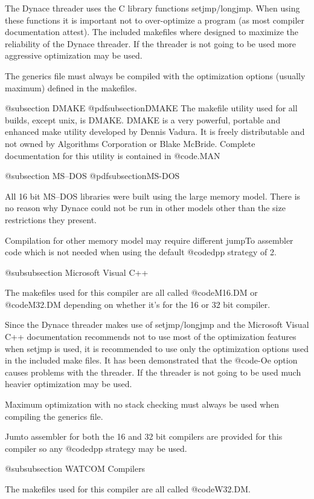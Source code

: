 The Dynace threader uses the C library functions setjmp/longjmp.  When using
these functions it is important not to over-optimize a program (as most
compiler documentation attest).  The included makefiles where designed
to maximize the reliability of the Dynace threader.  If the threader is not
going to be used more aggressive optimization may be used.

The generics file must always be compiled with the optimization options
(usually maximum) defined in the makefiles.


@subsection DMAKE
@pdfsubsection{DMAKE}
The makefile utility used for all builds, except unix, is DMAKE.
DMAKE is a very powerful, portable and enhanced make utility developed
by Dennis Vadura.  It is freely distributable and not owned by
Algorithms Corporation or Blake McBride.  Complete documentation for this utility
is contained in @code{\DYNACE\DOCS\DMAKE.MAN}

@subsection MS--DOS
@pdfsubsection{MS-DOS}

All 16 bit MS--DOS libraries were built using the large memory model.  There
is no reason why Dynace could not be run in other models other than the
size restrictions they present.  

Compilation for other memory model may require different jumpTo assembler
code which is not needed when using the default @code{dpp} strategy of 2.

@subsubsection Microsoft Visual C++

The makefiles used for this compiler are all called @code{M16.DM} or
@code{M32.DM} depending on whether it's for the 16 or 32 bit compiler.

Since the Dynace threader makes use of setjmp/longjmp and the Microsoft
Visual C++ documentation recommends not to use most of the optimization
features when setjmp is used, it is recommended to use only the
optimization options used in the included make files.  It has been
demonstrated that the @code{-Oe} option causes problems with the
threader.  If the threader is not going to be used much heavier
optimization may be used.

Maximum optimization with no stack checking must always be used when
compiling the generics file.

Jumto assembler for both the 16 and 32 bit compilers are provided for
this compiler so any @code{dpp} strategy may be used.

@subsubsection WATCOM Compilers

The makefiles used for this compiler are all called
@code{W32.DM}.

